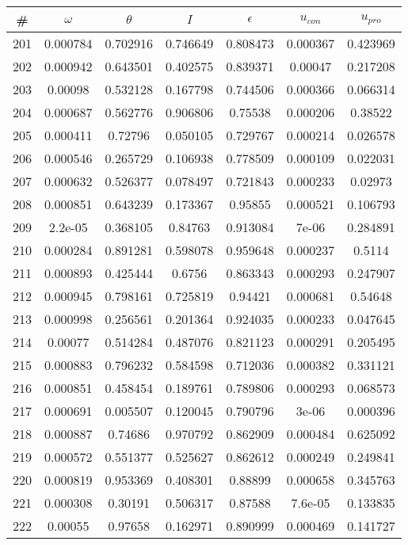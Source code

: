 \newpage
\begin{table}
\begin{tabular}{c|c|c|c|c|c|c}
\# & $\omega$ & $\theta$ & $I$ & $\epsilon$ & $u_{con}$ & $u_{pro}$\\
\hline
201 & 0.000784 & 0.702916 & 0.746649 & 0.808473 & 0.000367 & 0.423969\\
202 & 0.000942 & 0.643501 & 0.402575 & 0.839371 & 0.00047 & 0.217208\\
203 & 0.00098 & 0.532128 & 0.167798 & 0.744506 & 0.000366 & 0.066314\\
204 & 0.000687 & 0.562776 & 0.906806 & 0.75538 & 0.000206 & 0.38522\\
205 & 0.000411 & 0.72796 & 0.050105 & 0.729767 & 0.000214 & 0.026578\\
206 & 0.000546 & 0.265729 & 0.106938 & 0.778509 & 0.000109 & 0.022031\\
207 & 0.000632 & 0.526377 & 0.078497 & 0.721843 & 0.000233 & 0.02973\\
208 & 0.000851 & 0.643239 & 0.173367 & 0.95855 & 0.000521 & 0.106793\\
209 & 2.2e-05 & 0.368105 & 0.84763 & 0.913084 & 7e-06 & 0.284891\\
210 & 0.000284 & 0.891281 & 0.598078 & 0.959648 & 0.000237 & 0.5114\\
211 & 0.000893 & 0.425444 & 0.6756 & 0.863343 & 0.000293 & 0.247907\\
212 & 0.000945 & 0.798161 & 0.725819 & 0.94421 & 0.000681 & 0.54648\\
213 & 0.000998 & 0.256561 & 0.201364 & 0.924035 & 0.000233 & 0.047645\\
214 & 0.00077 & 0.514284 & 0.487076 & 0.821123 & 0.000291 & 0.205495\\
215 & 0.000883 & 0.796232 & 0.584598 & 0.712036 & 0.000382 & 0.331121\\
216 & 0.000851 & 0.458454 & 0.189761 & 0.789806 & 0.000293 & 0.068573\\
217 & 0.000691 & 0.005507 & 0.120045 & 0.790796 & 3e-06 & 0.000396\\
218 & 0.000887 & 0.74686 & 0.970792 & 0.862909 & 0.000484 & 0.625092\\
219 & 0.000572 & 0.551377 & 0.525627 & 0.862612 & 0.000249 & 0.249841\\
220 & 0.000819 & 0.953369 & 0.408301 & 0.88899 & 0.000658 & 0.345763\\
221 & 0.000308 & 0.30191 & 0.506317 & 0.87588 & 7.6e-05 & 0.133835\\
222 & 0.00055 & 0.97658 & 0.162971 & 0.890999 & 0.000469 & 0.141727\\

\end{tabular}
\end{table}
